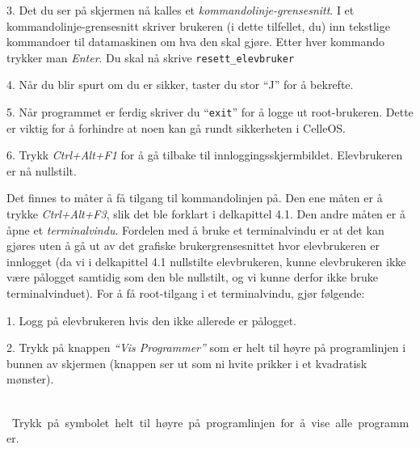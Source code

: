 \item{3.} Det du ser p\aa{} skjermen n\aa{} kalles et {\it kommando\-linje-grense\-snitt}. I et kommando\-linje-grense\-snitt skriver brukeren (i dette tilfellet, du) inn tekstlige kommandoer til datamaskinen om hva den skal gj\o re. Etter hver kommando trykker man {\it Enter}. Du skal n\aa{} skrive
\medskip
{\tt resett\_elevbruker}
\medskip
\item{4.} N\aa r du  blir spurt om du er sikker, taster du stor ``J'' for \aa{} bekrefte.

\item{5.} N\aa r programmet er ferdig skriver du ``{\tt exit}'' for \aa{} logge ut root-brukeren. Dette er viktig for \aa{} forhindre at noen kan g\aa{} rundt sikkerheten i CelleOS.

\item{6.} Trykk {\it Ctrl+Alt+F1} for \aa{} g\aa{} tilbake til inn\-loggings\-skjerm\-bildet. Elev\-brukeren er n\aa{} nullstilt.


Det finnes to m\aa ter \aa{} f\aa{} tilgang til kommando\-linjen p\aa . Den ene m\aa ten er \aa{} trykke {\it Ctrl+Alt+F3}, slik det ble forklart i delkapittel 4.1. Den andre m\aa ten er \aa{} \aa pne et {\it terminalvindu}. Fordelen med \aa{} bruke et terminalvindu er at det kan gj\o res uten \aa{} g\aa{} ut av det grafiske brukergrensesnittet hvor elevbrukeren er innlogget (da vi i delkapittel 4.1 nullstilte elevbrukeren, kunne elevbrukeren ikke v\ae re p\aa logget samtidig som den ble nullstilt, og vi kunne derfor ikke bruke terminalvinduet). For \aa{} f\aa{} root-tilgang i et terminalvindu, gj\o r f\o lgende:
\item{1.} Logg p\aa{} elevbrukeren hvis den ikke allerede er p\aa logget.
\item{2.} Trykk p\aa{} knappen {\it ``Vis Programmer''} som er helt til h\o yre p\aa{} programlinjen i bunnen av skjermen (knappen ser ut som ni hvite prikker i et kvadratisk m\o nster).

\medskip
\centerline{\baselineskip=9pt \vbox{\hbox{\epsfxsize 5cm  \epsfxsize 3cm }\vskip 1pt \hbox{\vbox{\hsize=8cm \noindent \fc \baselineskip=9pt Trykk p\aa{} symbolet helt til h\o yre p\aa{} programlinjen for \aa{} vise alle programmer.}}}}
\medskip

